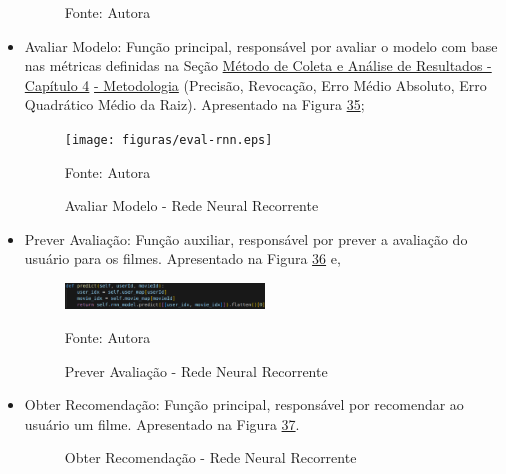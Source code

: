 \begin{itemize}
\begin{figure}[htbp]
        \small Fonte: Autora
    \end{figure}

    \item Avaliar Modelo: Função principal, responsável por avaliar o modelo com base nas métricas definidas na Seção 
    \hyperref[sec:meteanresul]{Método de Coleta e Análise de Resultados - Capítulo 4}
    \hyperref[sec:meteanresul]{ - Metodologia} 
    (Precisão, Revocação, Erro Médio Absoluto, Erro Quadrático Médio da Raiz).
    Apresentado na Figura \hyperref[fig:eval-rnn]{35};
    \begin{figure}[htbp]
        \centering
        \caption{Avaliar Modelo - Rede Neural Recorrente}
        \label{fig:eval-rnn}
        
        \vspace{2pt} %
        
        \texttt{[image: figuras/eval-rnn.eps]}
        
        \vspace{2pt} %
        
        \small Fonte: Autora
    \end{figure}

    \item Prever Avaliação: Função auxiliar, responsável por prever a avaliação do usuário para os filmes. Apresentado na
    Figura \hyperref[fig:pred-rnn]{36} e,
    \begin{figure}[htbp]
        \centering
        \caption{Prever Avaliação - Rede Neural Recorrente}
        \label{fig:pred-rnn}
        
        \vspace{2pt} %
        
        \includegraphics[width=0.5\textwidth]{figuras/pred-rnn.eps}
        
        \vspace{2pt} %
        
        \small Fonte: Autora
    \end{figure}

    \item Obter Recomendação: Função principal, responsável por recomendar ao usuário um filme. Apresentado na Figura
    \hyperref[fig:recom-rnn]{37}.
    \begin{figure}[htbp]
        \centering
        \caption{Obter Recomendação - Rede Neural Recorrente}
        \label{fig:recom-rnn}
        

\end{figure}
\end{itemize}
